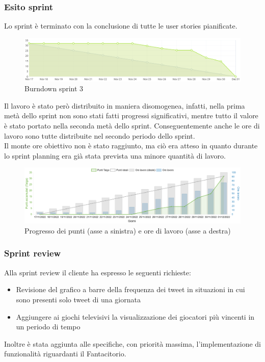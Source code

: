 \newpage
\subsubsection{Esito sprint}
Lo sprint è terminato con la conclusione di tutte le user stories pianificate.\\
\begin{figure}[H]
    \centering
    \includegraphics[width=15cm]{./img/sprint3/burndown.png}
    \caption{Burndown sprint 3}
\end{figure}
Il lavoro è stato però distribuito in maniera disomogenea, infatti, nella prima metà dello sprint non sono stati fatti progressi significativi,
mentre tutto il valore è stato portato nella seconda metà dello sprint. 
Conseguentemente anche le ore di lavoro sono tutte distribuite nel secondo periodo dello sprint.\\
Il monte ore obiettivo non è stato raggiunto, ma ciò era atteso in quanto durante lo sprint planning era già stata prevista una minore quantità di lavoro.
\begin{figure}[H]
    \centering
    \includegraphics[width=15cm]{./img/sprint3/worktime.png}
    \caption{Progresso dei punti (asse a sinistra) e ore di lavoro (asse a destra)}
\end{figure}


\subsubsection{Sprint review}
Alla sprint review il cliente ha espresso le seguenti richieste:
\begin{itemize}
    \item Revisione del grafico a barre della frequenza dei tweet in situazioni in cui sono presenti solo tweet di una giornata
    \item Aggiungere ai giochi televisivi la visualizzazione dei giocatori più vincenti in un periodo di tempo
\end{itemize} 
Inoltre è stata aggiunta alle specifiche, con priorità massima, l'implementazione di funzionalità riguardanti il Fantacitorio.


